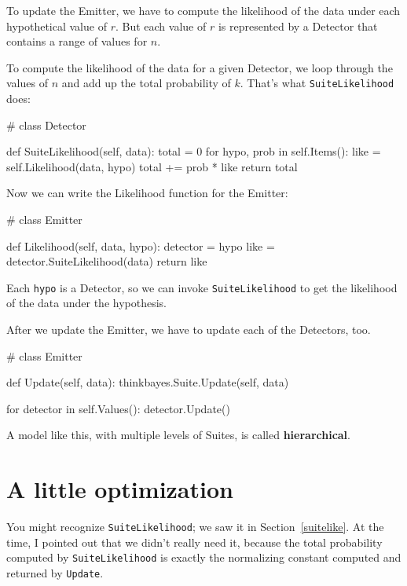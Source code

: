 \documentclass[12pt]{book}
\theoremstyle{exercise}
\begin{document}
To update the Emitter, we have to compute the likelihood of the data
under each hypothetical value of $r$.  But each value of $r$ is
represented by a Detector that contains a range of values for $n$.

To compute the likelihood of the data for a given Detector, we loop
through the values of $n$ and add up the total probability of $k$.
That's what {\tt SuiteLikelihood} does:

\begin{code}
# class Detector

    def SuiteLikelihood(self, data):
        total = 0
        for hypo, prob in self.Items():
            like = self.Likelihood(data, hypo)
            total += prob * like
        return total
\end{code}

Now we can write the Likelihood function for the Emitter:

\begin{code}
# class Emitter

    def Likelihood(self, data, hypo):
        detector = hypo
        like = detector.SuiteLikelihood(data)
        return like
\end{code}

Each {\tt hypo} is a Detector, so we can invoke
{\tt SuiteLikelihood} to get the likelihood of the data under
the hypothesis.

After we update the Emitter, we have to update each of the
Detectors, too.  

\begin{code}
# class Emitter

    def Update(self, data):
        thinkbayes.Suite.Update(self, data)
        
        for detector in self.Values():
            detector.Update()
\end{code}

A model like this, with multiple levels of Suites, is called {\bf
  hierarchical}.  


\section{A little optimization}

You might recognize {\tt SuiteLikelihood}; we saw it
in Section~\ref{suitelike}.  At the time, I pointed out that
we didn't really need it, because the total probability
computed by {\tt SuiteLikelihood} is exactly the normalizing
constant computed and returned by {\tt Update}.
 
\end{document}
